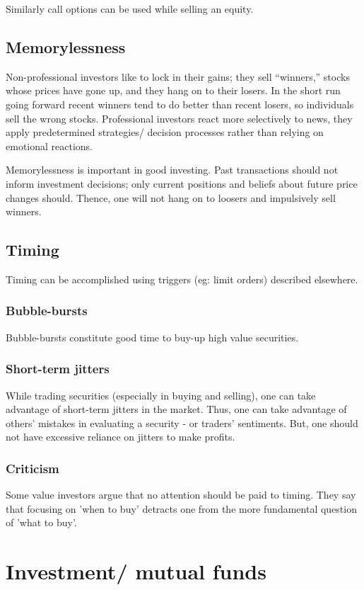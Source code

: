 \documentclass[oneside, article]{memoir}
\begin{document}
Similarly call options can be used while selling an equity.

\subsection{Memorylessness}
Non-professional investors like to lock in their gains; they sell “winners,” stocks whose prices have gone up, and they hang on to their losers. In the short run going forward recent winners tend to do better than recent losers, so individuals sell the wrong stocks. Professional investors react more selectively to news, they apply predetermined strategies/ decision processes rather than relying on emotional reactions.

Memorylessness is important in good investing. Past transactions should not inform investment decisions; only current positions and beliefs about future price changes should. Thence, one will not hang on to loosers and impulsively sell winners.

\subsection{Timing}
Timing can be accomplished using triggers (eg: limit orders) described elsewhere.

\subsubsection{Bubble-bursts}
Bubble-bursts constitute good time to buy-up high value securities.

\subsubsection{Short-term jitters}
While trading securities (especially in buying and selling), one can take advantage of short-term jitters in the market. Thus, one can take advantage of others' mistakes in evaluating a security - or traders' sentiments. But, one should not have excessive reliance on jitters to make profits.

\subsubsection{Criticism}
Some value investors argue that no attention should be paid to timing. They say that focusing on 'when to buy' detracts one from the more fundamental question of 'what to buy'.

\section{Investment/ mutual funds}
\end{document}
